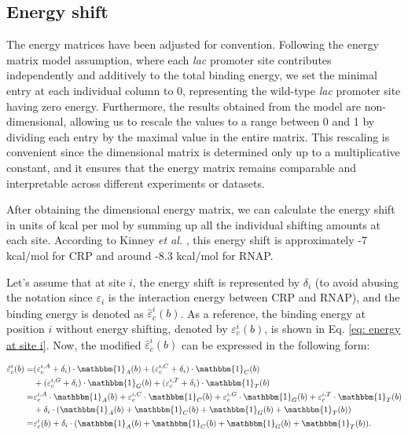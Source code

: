 \documentclass{article}
\begin{document}
\subsection{Energy shift}\label{sup sec: energy shift}

The energy matrices have been adjusted for convention. Following the energy matrix model assumption, where each \textit{lac} promoter site contributes independently and additively to the total binding energy, we set the minimal entry at each individual column to 0, representing the wild-type \textit{lac} promoter site having zero energy. Furthermore, the results obtained from the model are non-dimensional, allowing us to rescale the values to a range between 0 and 1 by dividing each entry by the maximal value in the entire matrix. This rescaling is convenient since the dimensional matrix is determined only up to a multiplicative constant, and it ensures that the energy matrix remains comparable and interpretable across different experiments or datasets. 

After obtaining the dimensional energy matrix, we can calculate the energy shift in units of kcal per mol by summing up all the individual shifting amounts at each site. According to Kinney \textit{et al.} \cite{Kinney2010PNAS}, this energy shift is approximately -7 kcal/mol for CRP and around -8.3 kcal/mol for RNAP.

Let's assume that at site $i$, the energy shift is represented by $\delta_i$ (to avoid abusing the notation since $\varepsilon_i$ is the interaction energy between CRP and RNAP), and the binding energy is denoted as $\hat{\varepsilon}^i_c (b)$. As a reference, the binding energy at position $i$ without energy shifting, denoted by $\varepsilon_c^{i} (b)$, is shown in Eq. \ref{eq: energy at site i}. Now, the modified $\hat{\varepsilon}^i_c (b)$ can be expressed in the following form:

\begin{equation}\label{eq: shift and no shift detailed}
\begin{aligned}
    \hat{\varepsilon}_c^{i} (b) 
    = & (\varepsilon_c^{i,A}+\delta_i) \cdot \mathbbm{1}_A(b)
    +(\varepsilon_c^{i,C}+\delta_i) \cdot \mathbbm{1}_C(b) \\
    &+(\varepsilon_c^{i,G}+\delta_i) \cdot \mathbbm{1}_G(b)
    +(\varepsilon_c^{i,T}+\delta_i) \cdot \mathbbm{1}_T(b) \\
    =& \varepsilon_c^{i,A} \cdot \mathbbm{1}_A(b)+\varepsilon_c^{i,C} \cdot \mathbbm{1}_C(b)+\varepsilon_c^{i,G} \cdot \mathbbm{1}_G(b)+\varepsilon_c^{i,T} \cdot \mathbbm{1}_T(b) \\
    &+ \delta_i \cdot (\mathbbm{1}_A(b)+\mathbbm{1}_C(b)+\mathbbm{1}_G(b)+\mathbbm{1}_T(b)) \\
    =& \varepsilon_c^{i} (b) + \delta_i \cdot (\mathbbm{1}_A(b)+\mathbbm{1}_C(b)+\mathbbm{1}_G(b)+\mathbbm{1}_T(b)).
\end{aligned}
\end{equation}
\end{document}
